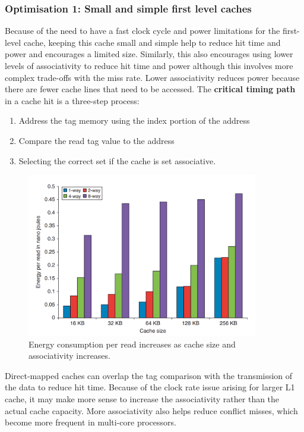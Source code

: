 \documentclass[11pt]{article}
\begin{document}
\subsubsection{Optimisation 1: Small and simple first level caches}
Because of the need to have a fast clock cycle and power limitations for the first-level cache, keeping this cache small and simple help to reduce hit time and power and encourages a limited size. Similarly, this also encourages using lower levels of associativity to reduce hit time and power although this involves more complex trade-offs with the miss rate. Lower associativity reduces power because there are fewer cache lines that need to be accessed.
\n
The \textbf{critical timing path} in a cache hit is a three-step process:
\begin{enumerate}
\item Address the tag memory using the index portion of the address
\item Compare the read tag value to the address
\item Selecting the correct set if the cache is set associative. 
\end{enumerate}
\begin{figure}[H]
\centering
\includegraphics[width=0.9\textwidth, keepaspectratio]{imgs/cache-optimisation1.png}
\caption{Energy consumption per read increases as cache size and associativity increases.}
\end{figure}
Direct-mapped caches can overlap the tag comparison with the transmission of the data to reduce hit time. Because of the clock rate issue arising for larger L1 cache, it may make more sense to increase the associativity rather than the actual cache capacity. More associativity also helps reduce conflict misses, which become more frequent in multi-core processors.
\end{document}

